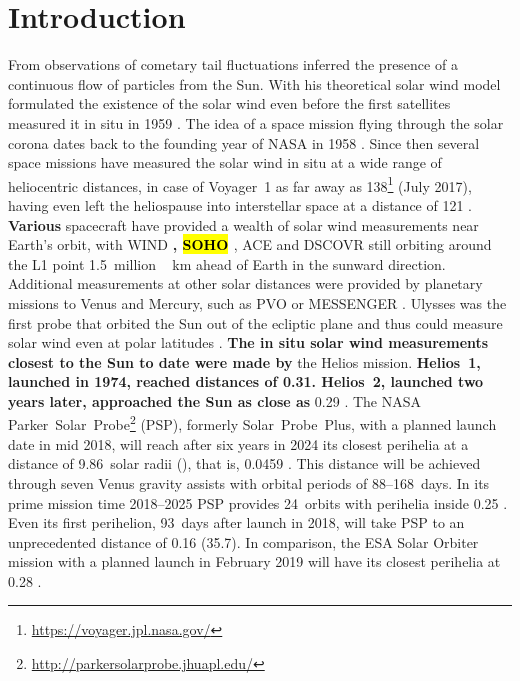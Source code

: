 
\section{Introduction}
From observations of cometary tail fluctuations \citet{Biermann1951} inferred the presence of a continuous flow of particles from the Sun. With his theoretical solar wind model \citet{Parker1958} formulated the existence of the solar wind even before the first satellites measured it in situ in 1959 \citep{Gringauz1960,Neugebauer1966}.
The idea of a space mission flying through the solar corona dates back to the founding year of NASA in 1958 \citep{McComas2008}. Since then several space missions have measured the solar wind in situ at a wide range of heliocentric distances, in case of Voyager~1 as far away as \SI{138}{\au}\footnote{\url{https://voyager.jpl.nasa.gov/}} (July 2017), having even left the heliospause into interstellar space at a distance of \SI{121}{\au} \citep{Gurnett2013}.
\textbf{Various} spacecraft have provided a wealth of solar wind measurements near Earth’s orbit, with WIND \citep{Lepping1995,Ogilvie1995}\textbf{, \hl{SOHO} \citep{Domingo1995}}, ACE \citep{Stone1998} and DSCOVR \citep{Burt2012} still orbiting around the L1 point \SI{1.5}{million\,\km} ahead of Earth in the sunward direction. Additional measurements at other solar distances were provided by planetary missions to Venus and Mercury, such as PVO \citep{Colin1980} or MESSENGER \citep{Belcher1991}. Ulysses was the first probe that orbited the Sun out of the ecliptic plane and thus could measure solar wind even at polar latitudes \citep{McComas1998}. \textbf{The in situ solar wind measurements closest to the Sun to date were made by} the Helios mission. \textbf{Helios~1, launched in 1974, reached distances of \SI{0.31}{\au}. Helios~2, launched two years later, approached the Sun as close as} \SI{0.29}{\au} \citep{Rosenbauer1977}.
The NASA Parker~Solar~Probe\footnote{\url{http://parkersolarprobe.jhuapl.edu/}} (PSP), formerly Solar~Probe~Plus, with a planned launch date in mid 2018, will reach after six years in 2024 its closest perihelia at a distance of 9.86~solar radii (\Rs), that is, \SI{0.0459}{\au} \citep{Fox2015}. This distance will be achieved through seven Venus gravity assists with orbital periods of 88--168~days. In its prime mission time 2018--2025 PSP provides 24~orbits with perihelia inside \SI{0.25}{\au} \citep{Fox2015}. Even its first perihelion, 93~days after launch in 2018, will take PSP to an unprecedented distance of \SI{0.16}{\au} (\SI{35.7}{\Rs}). In comparison, the ESA Solar Orbiter mission with a planned launch in February 2019 will have its closest perihelia at \SI{0.28}{\au} \citep{Muller2013}.


